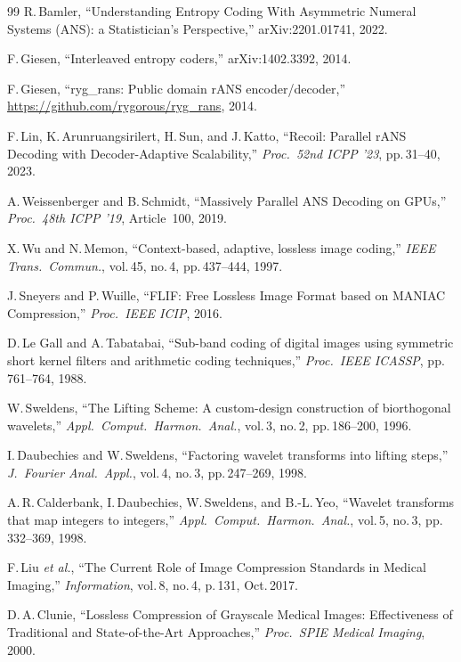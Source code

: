\documentclass[journal]{IEEEtran}
\begin{document}
\begin{thebibliography}{99}
R.\,Bamler, ``Understanding Entropy Coding With Asymmetric Numeral Systems
(ANS): a Statistician's Perspective,'' arXiv:2201.01741, 2022.

F.\,Giesen, ``Interleaved entropy coders,'' arXiv:1402.3392, 2014.

F.\,Giesen, ``ryg\_rans: Public domain rANS encoder/decoder,''
\url{https://github.com/rygorous/ryg_rans}, 2014.

F.\,Lin, K.\,Arunruangsirilert, H.\,Sun, and J.\,Katto,
``Recoil: Parallel rANS Decoding with Decoder-Adaptive Scalability,''
\textit{Proc.\ 52nd ICPP '23}, pp.\,31--40, 2023.

A.\,Weissenberger and B.\,Schmidt,
``Massively Parallel ANS Decoding on GPUs,''
\textit{Proc.\ 48th ICPP '19}, Article~100, 2019.

X.\,Wu and N.\,Memon,
``Context-based, adaptive, lossless image coding,''
\textit{IEEE Trans.\ Commun.}, vol.\,45, no.\,4, pp.\,437--444, 1997.

J.\,Sneyers and P.\,Wuille,
``FLIF: Free Lossless Image Format based on MANIAC Compression,''
\textit{Proc.\ IEEE ICIP}, 2016.

D.\,Le Gall and A.\,Tabatabai,
``Sub-band coding of digital images using symmetric short kernel filters and
arithmetic coding techniques,'' \textit{Proc.\ IEEE ICASSP}, pp.\,761--764,
1988.

W.\,Sweldens,
``The Lifting Scheme: A custom-design construction of biorthogonal wavelets,''
\textit{Appl.\ Comput.\ Harmon.\ Anal.}, vol.\,3, no.\,2, pp.\,186--200, 1996.

I.\,Daubechies and W.\,Sweldens,
``Factoring wavelet transforms into lifting steps,''
\textit{J.\ Fourier Anal.\ Appl.}, vol.\,4, no.\,3, pp.\,247--269, 1998.

A.\,R.\,Calderbank, I.\,Daubechies, W.\,Sweldens, and B.-L.\,Yeo,
``Wavelet transforms that map integers to integers,''
\textit{Appl.\ Comput.\ Harmon.\ Anal.}, vol.\,5, no.\,3, pp.\,332--369, 1998.


F.\,Liu \textit{et al.},
``The Current Role of Image Compression Standards in Medical Imaging,''
\textit{Information}, vol.\,8, no.\,4, p.\,131, Oct.\,2017.

D.\,A.\,Clunie,
``Lossless Compression of Grayscale Medical Images: Effectiveness of
Traditional and State-of-the-Art Approaches,''
\textit{Proc.\ SPIE Medical Imaging}, 2000.


\end{thebibliography}
\end{document}
